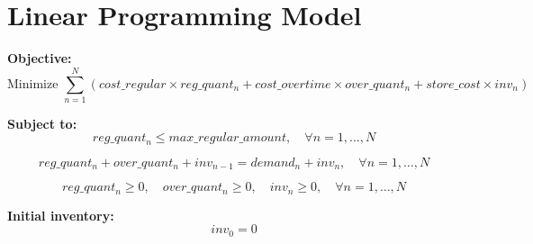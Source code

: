 \documentclass{article}
\begin{document}
\section*{Linear Programming Model}

\textbf{Objective:}
\[
\text{Minimize } \sum_{n=1}^{N} \left( cost\_regular \times reg\_quant_n + cost\_overtime \times over\_quant_n + store\_cost \times inv_n \right)
\]

\textbf{Subject to:}
\[
reg\_quant_n \leq max\_regular\_amount, \quad \forall n = 1, \ldots, N
\]

\[
reg\_quant_n + over\_quant_n + inv_{n-1} = demand_n + inv_n, \quad \forall n = 1, \ldots, N
\]

\[
reg\_quant_n \geq 0, \quad over\_quant_n \geq 0, \quad inv_n \geq 0, \quad \forall n = 1, \ldots, N
\]

\textbf{Initial inventory:}
\[
inv_0 = 0
\]
\end{document}
